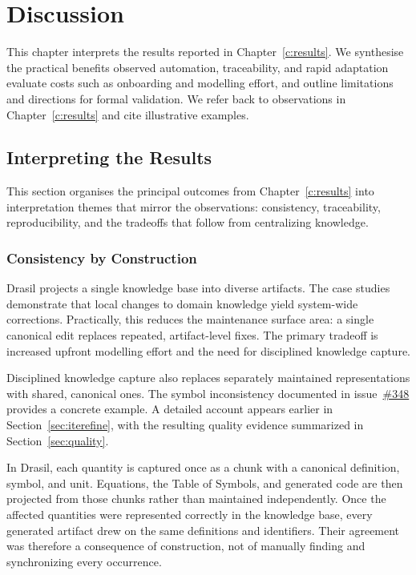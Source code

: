 \chapter{Discussion}
\label{c:discussion}

This chapter interprets the results reported in Chapter~\ref{c:results}.
We synthesise the practical benefits observed \textemdash{} automation, 
traceability, and rapid adaptation \textemdash{} evaluate costs such as 
onboarding and modelling effort, and outline limitations and directions for 
formal validation. We refer back to observations in Chapter~\ref{c:results} and 
cite illustrative examples.

\section{Interpreting the Results}

This section organises the principal outcomes from
Chapter~\ref{c:results} into interpretation themes that mirror the
observations: consistency, traceability, reproducibility, and the
tradeoffs that follow from centralizing knowledge.

\subsection{Consistency by Construction}
\label{sec:dis_consistency}

Drasil projects a single knowledge base into diverse artifacts. The case
studies demonstrate that local changes to domain knowledge yield system-wide
corrections. Practically, this reduces the maintenance surface area: a
single canonical edit replaces repeated, artifact-level fixes. The primary
tradeoff is increased upfront modelling effort and the need for disciplined
knowledge capture.

Disciplined knowledge capture also replaces separately maintained
representations with shared, canonical ones. The \sp{} symbol inconsistency
documented in
issue~\href{https://github.com/JacquesCarette/Drasil/issues/348}{\#348} provides
a concrete example. A detailed account appears earlier in
Section~\ref{sec:iterefine}, with the resulting quality evidence summarized in
Section~\ref{sec:quality}.

In Drasil, each quantity is captured once as a chunk with a canonical
definition, symbol, and unit. Equations, the Table of Symbols, and generated
code are then projected from those chunks rather than maintained
independently. Once the affected quantities were represented correctly in the
knowledge base, every generated artifact drew on the same definitions and
identifiers. Their agreement was therefore a consequence of construction,
not of manually finding and synchronizing every occurrence.

